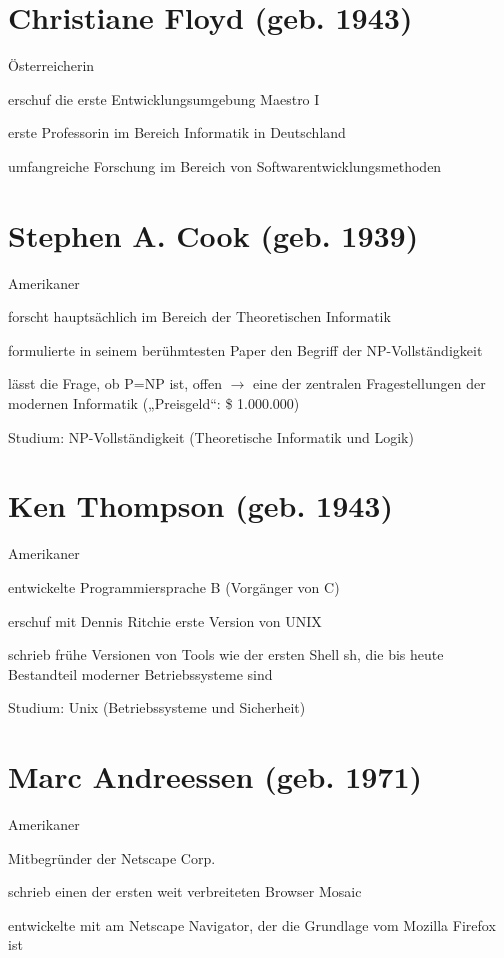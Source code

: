 \documentclass[a4paper,12pt]{report}
\begin{document}
\newpage

\section*{Christiane Floyd (geb. 1943)}
\begin{itemize*}
	\item Österreicherin
	\item erschuf die erste Entwicklungsumgebung Maestro I
	\item erste Professorin im Bereich Informatik in Deutschland
	\item umfangreiche Forschung im Bereich von Softwarentwicklungsmethoden
\end{itemize*}

\section*{Stephen A. Cook (geb. 1939)}
\begin{itemize*}
	\item Amerikaner
	\item forscht hauptsächlich im Bereich der Theoretischen Informatik
	\item formulierte in seinem berühmtesten Paper den Begriff der NP-Vollständigkeit
	\item lässt die Frage, ob P=NP ist, offen $\rightarrow$ eine der zentralen Fragestellungen
	      der modernen Informatik („Preisgeld“: \$ 1.000.000)
	\item Studium: NP-Vollständigkeit (Theoretische Informatik und Logik)
\end{itemize*}

\section*{Ken Thompson (geb. 1943)}
\begin{itemize*}
	\item Amerikaner
	\item entwickelte Programmiersprache B (Vorgänger von C)
	\item erschuf mit Dennis Ritchie erste Version von UNIX
	\item schrieb frühe Versionen von Tools wie der ersten Shell sh, die bis heute Bestandteil
	      moderner Betriebssysteme sind
	\item Studium: Unix (Betriebssysteme und Sicherheit)
\end{itemize*}

\section*{Marc Andreessen (geb. 1971)}
\begin{itemize*}
	\item Amerikaner
	\item Mitbegründer der Netscape Corp.
	\item schrieb einen der ersten weit verbreiteten Browser Mosaic
	\item entwickelte mit am Netscape Navigator, der die Grundlage vom Mozilla Firefox ist
\end{itemize*}
\end{document}
